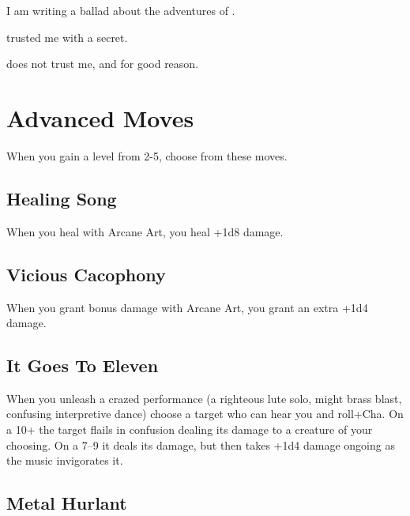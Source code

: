 I am writing a ballad about the adventures of \thinrules[n=2].

         

\thinrules[n=2] trusted me with a secret.

         

\thinrules[n=2] does not trust me, and for good reason.

       

       
\section{Advanced Moves}    
       

         
\startInstructionsAfterHeader
When you gain a level from 2-5, choose from these moves.
\stopInstructionsAfterHeader
         
\subsection{Healing Song}   
         

When you heal with Arcane Art, you heal +1d8 damage.

         
\subsection{Vicious Cacophony}    
         

When you grant bonus damage with Arcane Art, you grant an extra +1d4 damage.

         
\subsection{It Goes To Eleven}   
         

When you unleash a crazed performance (a righteous lute solo, might brass blast, confusing interpretive dance) choose a target who can hear you and roll+Cha. On a 10+ the target flails in confusion dealing its damage to a creature of your choosing. On a 7–9 it deals its damage, but then takes +1d4 damage ongoing as the music invigorates it.

         
\subsection{Metal Hurlant}    
         

